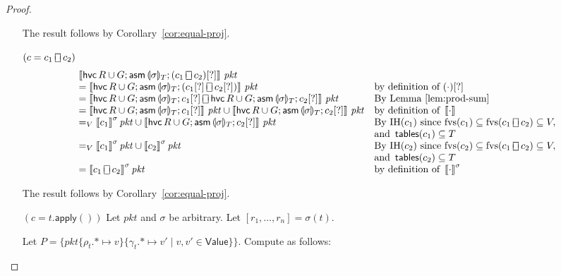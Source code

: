 \documentclass{article}
\newcommand{\pkt}{\mathit{pkt}}
\newcommand{\denote}[1]{\left\llbracket#1\right\rrbracket}
\newcommand{\Value}{\mathsf{Value}}
\newcommand{\assume}{\mathop{\mathsf{asm}}}
\newcommand{\apply}{\mathsf{apply}}
\newcommand{\choiceop}{\rotatebox[origin=c]{90}{$\sqsubset\!\!\!\sqsupset$}}
\newcommand{\choice}{\mathbin{\choiceop}}
\newcommand{\havoc}[1]{\mathop{\mathsf{hvc}}#1}
\newcommand{\state}[1]{\llparenthesis#1\rrparenthesis}
\newcommand{\instr}{[?]}
\newcommand{\fvs}{\textrm{fvs}}
\newcommand{\tables}{\mathop{\mathsf{tables}}}
\theoremstyle{plain}
\theoremstyle{definition}
\theoremstyle{remark}
\begin{document}
\begin{proof}
\begin{enumerate}[align=left]
    The result follows by Corollary~\ref{cor:equal-proj}.

  \item[$(c = c_1\choice c_2)$]
    \[\begin{array}{ll}
    \denote{\havoc{R \cup G};\assume{\state\sigma_{T}}; (c_1 \choice c_2)\instr}\,\pkt
    & \\
    = \denote{\havoc{R \cup G};\assume{\state\sigma_{T}}; (c_1\instr \choice c_2\instr)}\,\pkt
    & \text{by definition of }(\cdot)\instr\\
    = \denote{\havoc{R \cup G};\assume{\state\sigma_{T}}; c_1\instr
      \choice \havoc{R \cup G};\assume{\state\sigma_{T}}; c_2\instr}\,\pkt
    & \text{By Lemma~\ref{lem:prod-sum}} \\
    = \denote{\havoc{R \cup G}; \assume{\state\sigma_{T}}; c_1\instr}\,\pkt
    \cup \denote{\havoc{R \cup G}; \assume{\state\sigma_{T}}; c_2\instr}\,\pkt
    & \text{by definition of }\denote{\cdot} \\
    =_V \denote{c_1}^\sigma\pkt \cup \denote{\havoc{R \cup G}; \assume{\state\sigma_{T}}; c_2\instr}\,\pkt
    & \text{By IH}(c_1) \text{ since } \fvs(c_1) \subseteq \fvs(c_1 \choice c_2) \subseteq V, \\
    & \text{and }\tables(c_1) \subseteq T \\
    =_V \denote{c_1}^\sigma\pkt \cup \denote{c_2}^\sigma\pkt
    & \text{By IH}(c_2) \text{ since } \fvs(c_2) \subseteq \fvs(c_1 \choice c_2) \subseteq V,\\
    & \text{and }\tables(c_2) \subseteq T \\
    = \denote{c_1 \choice c_2}^\sigma\pkt
    & \text{by definition of }\denote{\cdot}^\sigma
    \end{array}
    \]

    The result follows by Corollary~\ref{cor:equal-proj}.

  \item[$(c = t.\apply())$] Let $\pkt$ and $\sigma$ be arbitrary. Let
    $[r_1,\ldots, r_n] = \sigma(t)$.

    Let $P = \{\pkt\{\rho_t.* \mapsto
      v\}\{\gamma_t.* \mapsto v' \mid v,v' \in \Value\} \}$.
      Compute as follows:


\end{enumerate}
\end{proof}
\end{document}
